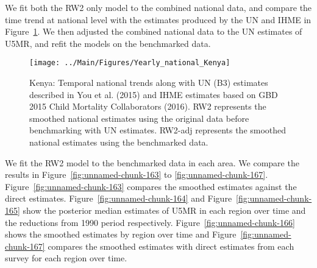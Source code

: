 \documentclass[12pt]{article}\usepackage[]{graphicx}\usepackage[]{color}
\newenvironment{knitrout}{}{} %
\begin{document}
We fit both the RW2 only model to the combined national data, and compare the time trend at national level with the estimates produced by the UN and IHME in Figure~\ref{fig:unnamed-chunk-162}. We then adjusted the combined national data to the UN estimates of U5MR, and refit the models on the benchmarked data. 

\begin{knitrout}
\color{fgcolor}\begin{figure}[bht]

{\centering \texttt{[image: ../Main/Figures/Yearly\_national\_Kenya]} 

}

\caption[Kenya]{Kenya: Temporal national trends along with UN (B3) estimates described in You et al. (2015) and IHME estimates based on GBD 2015 Child Mortality Collaborators (2016). RW2 represents the smoothed national estimates using the original data before benchmarking with UN estimates. RW2-adj represents the smoothed national estimates using the benchmarked data.}\label{fig:unnamed-chunk-162}
\end{figure}


\end{knitrout}
 

We fit the RW2 model to the benchmarked data in each area. 
We compare the results in Figure~\ref{fig:unnamed-chunk-163} to \ref{fig:unnamed-chunk-167}.
Figure~\ref{fig:unnamed-chunk-163} compares the smoothed estimates against the direct estimates. Figure~\ref{fig:unnamed-chunk-164} and Figure~\ref{fig:unnamed-chunk-165} show the posterior median estimates of U5MR in each region over time and the reductions from 1990 period respectively.
Figure~\ref{fig:unnamed-chunk-166} shows the smoothed estimates by region over time and Figure~\ref{fig:unnamed-chunk-167} compares the smoothed estimates with direct estimates from each survey for each region over time.




\end{document}
